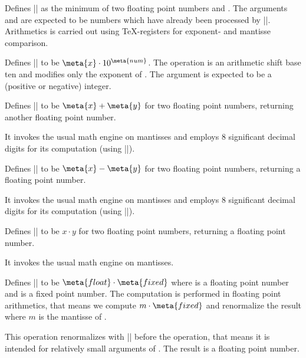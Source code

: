 \begin{command}{}
	Defines |\pgfmathresult| as the minimum of two floating point numbers  and . The arguments  and  are expected to be numbers which have already been processed by |\pgfmathfloatparsenumber|. Arithmetics is carried out using \TeX-registers for exponent- and mantisse comparison.
\end{command}


\begin{command}{}
	Defines |\pgfmathresult| to be $\meta{x} \cdot 10^{\meta{num}}$. The operation is an arithmetic shift base ten and modifies only the exponent of . The argument  is expected to be a (positive or negative) integer.
\end{command}

\begin{command}{}
	Defines |\pgfmathresult| to be $\meta{x} + \meta{y}$ for two floating point numbers, returning another floating point number.

	It invokes the usual math engine on mantisses and employs 8 significant decimal digits for its computation (using |\pgfmathfloattoextentedprecision|).
\end{command}

\begin{command}{}
	Defines |\pgfmathresult| to be $\meta{x} - \meta{y}$ for two floating point numbers, returning a floating point number.

	It invokes the usual math engine on mantisses and employs 8 significant decimal digits for its computation (using |\pgfmathfloattoextentedprecision|).
\end{command}

\begin{command}{}
	Defines |\pgfmathresult| to be $x \cdot y$ for two floating point numbers, returning a floating point number.
	
	It invokes the usual math engine on mantisses.
\end{command}
\begin{command}{\pgfmathfloatmultiplyfixed{}}
	Defines |\pgfmathresult| to be $\meta{float} \cdot \meta{fixed}$ where  is a floating point number and  is a fixed point number. The computation is performed in floating point arithmetics, that means we compute $m \cdot \meta{fixed}$ and renormalize the result where $m$ is the mantisse of .

	This operation renormalizes  with |\pgfmathfloattoextentedprecision| before the operation, that means it is intended for relatively small arguments of . The result is a floating point number.
\end{command}


